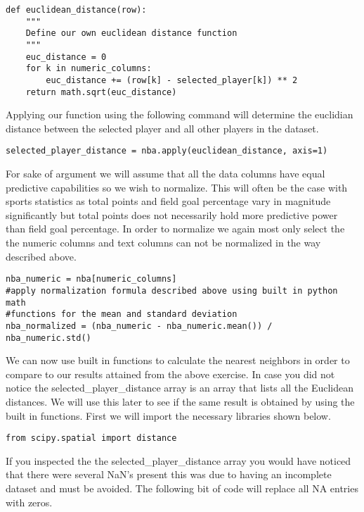 \begin{lstlisting}
def euclidean_distance(row):
    """
    Define our own euclidean distance function
    """
    euc_distance = 0
    for k in numeric_columns:
        euc_distance += (row[k] - selected_player[k]) ** 2
    return math.sqrt(euc_distance)
\end{lstlisting} 

Applying our function using the following command will determine the
euclidian distance between the selected player and all other players
in the dataset. 

\begin{lstlisting}
selected_player_distance = nba.apply(euclidean_distance, axis=1)
\end{lstlisting} 

For sake of argument we will assume that all the data columns have
equal predictive capabilities so we wish to normalize. This will often
be the case with sports statistics as total points and field goal
percentage vary in magnitude significantly but total points does not
necessarily hold more predictive power than field goal percentage. In
order to normalize we again most only select the the numeric columns
and text columns can not be normalized in the way described above. 


\begin{lstlisting}
nba_numeric = nba[numeric_columns]
#apply normalization formula described above using built in python math
#functions for the mean and standard deviation
nba_normalized = (nba_numeric - nba_numeric.mean()) / nba_numeric.std()
\end{lstlisting} 

We can now use built in functions to calculate the nearest
neighbors in order to compare to our results attained from the above
exercise. In case you did not notice the selected\_player\_distance
array is an array that lists all the Euclidean distances. We will use
this later to see if the same result is obtained by using the built in
functions. First we will import the necessary libraries shown below. 

 \begin{lstlisting}
from scipy.spatial import distance
\end{lstlisting} 

If you inspected the the selected\_player\_distance array you would have
noticed that there were several NaN's present this was due to having
an incomplete dataset and must be avoided. The following bit of code
will replace all NA entries with zeros. 

